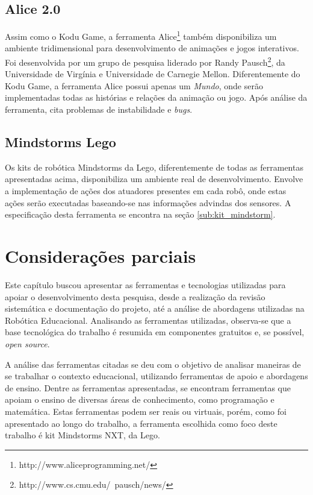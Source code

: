 
	\subsection{Alice 2.0} %
	\label{sub:alice}
		Assim como o Kodu Game, a ferramenta Alice\footnote{http://www.aliceprogramming.net/} também disponibiliza um ambiente tridimensional para desenvolvimento de animações e jogos interativos. Foi desenvolvida por um grupo de pesquisa liderado por Randy Pausch\footnote{http://www.cs.cmu.edu/~pausch/news/}, da Universidade de Virgínia e Universidade de Carnegie Mellon. Diferentemente do Kodu Game, a ferramenta Alice possui apenas um \textit{Mundo}, onde serão implementadas todas as histórias e relações da animação ou jogo. Após análise da ferramenta, \cite{analiseFerramentaEnsinoComputacao} cita problemas de instabilidade e \textit{bugs}.
	

	\subsection{Mindstorms Lego} %
	\label{sub:mindstorm_lego}

		Os kits de robótica Mindstorms da Lego, diferentemente de todas as ferramentas apresentadas acima, disponibiliza um ambiente real de desenvolvimento. Envolve a implementação de ações dos atuadores presentes em cada robô, onde estas ações serão executadas baseando-se nas informações advindas dos sensores. A especificação desta ferramenta se encontra na seção \ref{sub:kit_mindstorm}.
	
	
\section{Considerações parciais} %
\label{sec:considerações_parciais}

	Este capítulo buscou apresentar as ferramentas e tecnologias utilizadas para apoiar o desenvolvimento desta pesquisa, desde a realização da revisão sistemática e documentação do projeto, até a análise de abordagens utilizadas na Robótica Educacional. Analisando as ferramentas utilizadas, observa-se que a base tecnológica do trabalho é resumida em componentes gratuitos e, se possível, \textit{open source}.

	A análise das ferramentas citadas se deu com o objetivo de analisar maneiras de se trabalhar o contexto educacional, utilizando ferramentas de apoio e abordagens de ensino. Dentre as ferramentas apresentadas, se encontram ferramentas que apoiam o ensino de diversas áreas de conhecimento, como programação e matemática. Estas ferramentas podem ser reais ou virtuais, porém, como foi apresentado ao longo do trabalho, a ferramenta escolhida como foco deste trabalho é kit Mindstorms NXT, da Lego.


